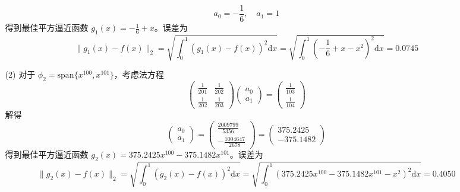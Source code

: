 \documentclass{sjtuarticle}
\def\dd{\mathrm{d}}
\begin{document}
\begin{itemize}
\begin{solution}
\begin{itemize}
\begin{equation*}
                a_0 = -\frac{1}{6}, \quad a_1 = 1
            \end{equation*}
            得到最佳平方逼近函数 $g_1(x)=-\frac{1}{6}+x$。误差为
            \begin{equation*}
                \lVert g_1(x)-f(x) \rVert_2=\sqrt{\int_{0}^1 (g_1(x)-f(x))^2 \dd x}=\sqrt{\int_{0}^1 \left(-\frac{1}{6}+x-x^2\right)^2 \dd x}=0.0745
            \end{equation*}
            \item[(2)] 对于 $\phi_2=\text{span}\{x^{100},x^{101}\}$，考虑法方程
            \begin{equation*}
                \begin{pmatrix}
                    \frac{1}{201} & \frac{1}{202} \\ \frac{1}{202} & \frac{1}{203}
                \end{pmatrix}\begin{pmatrix}
                    a_0 \\ a_1
                \end{pmatrix}=\begin{pmatrix}
                    \frac{1}{103} \\ \frac{1}{104}
                \end{pmatrix}
            \end{equation*}
            解得
            \begin{equation*}
                \begin{pmatrix}
                    a_0 \\ a_1
                \end{pmatrix}=
                \left(\begin{array}{c}
                    \frac{2009799}{5356}\\
                    -\frac{1004647}{2678}
                    \end{array}\right)=\begin{pmatrix}
                        375.2425 \\ -375.1482
                    \end{pmatrix}
            \end{equation*}
            得到最佳平方逼近函数 $g_2(x)=375.2425x^{100}-375.1482x^{101}$。误差为
            \begin{equation*}
                \lVert g_2(x)-f(x) \rVert_2=\sqrt{\int_{0}^1 (g_2(x)-f(x))^2 \dd x}=\sqrt{\int_{0}^1 \left(375.2425x^{100}-375.1482x^{101}-x^2\right)^2 \dd x}=0.4050
            \end{equation*}

\end{itemize}
\end{solution}
\end{itemize}
\end{document}

